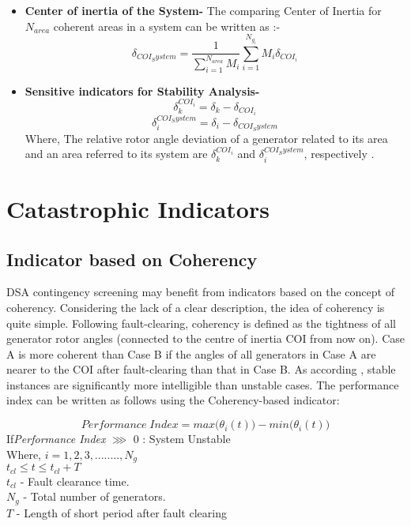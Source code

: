 \begin{itemize}
\item \textbf{Center of inertia of the System-}
The comparing Center of Inertia for \(N_{area}\) coherent areas in a system can be written as \cite{8}:-
\begin{equation}
\delta_{COI_System} = \frac{1}{\sum_{i=1}^{N_{area}} M_i } \sum_{i=1}^{N_{g_i}} M_i \delta_{COI_i}
\end{equation} 
\item \textbf{Sensitive indicators for Stability Analysis-}\begin{equation}
\delta_{k}^{COI_i} = \delta_k - \delta_{COI_i} 
\end{equation}\begin{equation}
\delta_{i}^{COI_System} = \delta_i - \delta_{COI_System} 
\end{equation}Where, The relative rotor angle deviation of a generator related to its area and an area referred to its system are \(\delta_{k}^{COI_i}\) and \(\delta_{i}^{COI_System}\), respectively \cite{9}.



\end{itemize}


\section{Catastrophic Indicators}\label{Catastrophic Indicators}
\subsection{Indicator based on Coherency}
DSA contingency screening may benefit from indicators based on the concept of coherency. Considering the lack of a clear description, the idea of coherency is quite simple. Following fault-clearing, coherency is defined as the tightness of all generator rotor angles (connected to the centre of inertia COI from now on). Case A is more coherent than Case B if the angles of all generators in Case A are nearer to the COI after fault-clearing than that in Case B. As according \cite{EPM}, stable instances are significantly more intelligible than unstable cases. The performance index can be written as follows using the Coherency-based indicator:

\begin{equation}
Performance \; Index = max\big(\theta_i(t)\big)-min\big(\theta_i(t)\big) \label{IS}
\end{equation}
\tab If\tab  \textit{Performance Index } \(\ggg\) 0 : System Unstable\\
\tab Where, \hspace{0.7 cm}\(i = 1, 2, 3, ........, N_g\) \\
\tab\tab\tab \(t_{cl} \leq t \leq t_{cl}+T\) 
\\\tab\tab\tab \(t_{cl}\) - Fault clearance time. 
\\\tab\tab\tab \(N_g\) -  Total number of generators.
\\\tab\tab\tab \(T\) - Length of short period after fault clearing

